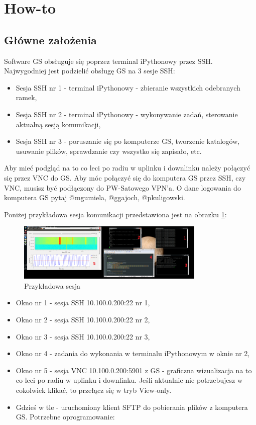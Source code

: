 \section{How-to}
\subsection{Główne założenia}
Software GS obsługuje się poprzez terminal iPythonowy przez SSH. Najwygodniej jest podzielić obsługę GS na 3 sesje SSH:

\begin{itemize}
	\item Sesja SSH nr 1 - terminal iPythonowy - zbieranie wszystkich odebranych ramek,
	\item Sesja SSH nr 2 - terminal iPythonowy - wykonywanie zadań, sterowanie aktualną sesją komunikacji,
	\item Sesja SSH nr 3 - poruszanie się po komputerze GS, tworzenie katalogów, usuwanie plików, sprawdzanie czy wszystko się zapisało, etc.
\end{itemize}

Aby mieć podgląd na to co leci po radiu w uplinku i downlinku należy połączyć się przez VNC do GS. Aby móc połączyć się do komputera GS przez SSH, czy VNC, musisz być podłączony do PW-Satowego VPN'a. O dane logowania do komputera GS pytaj @mgumiela, @ggajoch, @pkuligowski.

Poniżej przykładowa sesja komunikacji przedstawiona jest na obrazku \ref{fig:gs:samplesession}:
\begin{figure}
	\includegraphics[width=0.8\textwidth]{gs/img/gs-mission-2.png}
	\caption{\label{fig:gs:samplesession} Przykładowa sesja}
\end{figure}

\begin{itemize}
	\item Okno nr 1 - sesja SSH 10.100.0.200:22 nr 1,
	\item Okno nr 2 - sesja SSH 10.100.0.200:22 nr 2,
	\item Okno nr 3 - sesja SSH 10.100.0.200:22 nr 3,
	\item Okno nr 4 - zadania do wykonania w terminalu iPythonowym w oknie nr 2,
	\item Okno nr 5 - sesja VNC 10.100.0.200:5901 z GS - graficzna wizualizacja na to co leci po radiu w uplinku i downlinku. Jeśli aktualnie nie potrzebujesz w cokolwiek klikać, to przełącz się w tryb View-only.
	\item Gdzieś w tle - uruchomiony klient SFTP do pobierania plików z komputera GS.
Potrzebne oprogramowanie:
\end{itemize}

